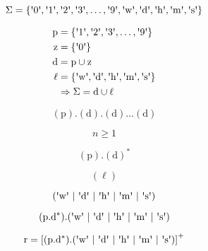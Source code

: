 \documentclass[12pt]{article}
\newcommand{\menquote}[1]{\ensuremath{\text{\textquotesingle} #1 \text{\textquotesingle}}}
\newcommand{\md}{\mathrm{d}}
\newcommand{\mz}{\mathrm{z}}
\newcommand{\mrp}{\mathrm{p}}
\begin{document}
\begin{equation*}
\Sigma = \{\menquote{0}, \menquote{1}, \menquote{2}, \menquote{3}, \dots, \menquote{9}, \menquote{\mathrm{w}}, \menquote{\mathrm{d}}, \menquote{\mathrm{h}}, \menquote{\mathrm{m}}, \menquote{\mathrm{s}}\}
\end{equation*}

\begin{equation*}
\begin{split}
\mrp & = \{\menquote{1}, \menquote{2}, \menquote{3}, \dots, \menquote{9}\} \\
\mz & = \{\menquote{0}\} \\
\md & = \mrp\cup \mz \\
\ell & = \{\menquote{\mathrm{w}}, \menquote{\md}, \menquote{\mathrm{h}}, \menquote{\mathrm{m}}, \menquote{\mathrm{s}}\} \\
& \Rightarrow \Sigma = \md \cup \ell
\end{split}
\end{equation*}

\begin{equation*}
(\mrp).(\md).(\md)\dots (\md)
\end{equation*}

\begin{equation*}
n \geqslant 1
\end{equation*}

\begin{equation*}
(\mrp).(\md)^*
\end{equation*}

\begin{equation*}
(\ell)
\end{equation*}

\begin{equation*}
(\menquote{\mathrm{w}} \ \vert \ \menquote{\md} \ \vert \ \menquote{\mathrm{h}} \ \vert \ \menquote{\mathrm{m}} \ \vert \ \menquote{\mathrm{s}})
\end{equation*}

\begin{equation*}
(\mrp.\md^*).(\menquote{\mathrm{w}} \ \vert \ \menquote{\md} \ \vert \ \menquote{\mathrm{h}} \ \vert \ \menquote{\mathrm{m}} \ \vert \ \menquote{\mathrm{s}})
\end{equation*}

\begin{equation*}
\mathrm{r} = \left[ (\mrp.\md^*).(\menquote{\mathrm{w}} \ \vert \ \menquote{\md} \ \vert \ \menquote{\mathrm{h}} \ \vert \ \menquote{\mathrm{m}} \ \vert \ \menquote{\mathrm{s}})\right]^+
\end{equation*}
\end{document}
